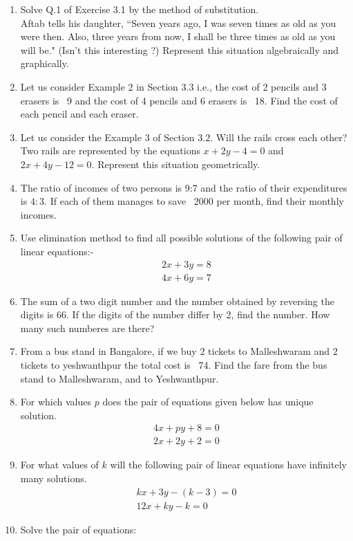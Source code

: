 \documentclass{article}
\theoremstyle{remark}
\begin{document}
\begin{enumerate}
\item Solve Q.1 of Exercise 3.1 by the method of substitution.
\\ Aftab tells his daughter, ``Seven years ago, I was seven times as old as you were then. Also, three years from now, I shall be three times as old as you will be."  (Isn't this interesting ?) Represent this situation algebraically and graphically.
\item Let us consider Example 2 in Section $3.3$ i.e., the cost of 2 pencils and 3 erasers is \rupee~9 and the cost of 4 pencils and 6 erasers is \rupee~18. Find the cost of each pencil and each eraser.
\item Let us consider the Example $3$ of Section $3.2$. Will the rails cross each other? Two rails are represented by the equations $x+2y-4=0$ and $2x+4y-12=0$. Represent this situation geometrically.
\item The ratio of incomes of two persons is 9:7 and the ratio of their expenditures is $4:3$. If each of them manages to save \rupee~2000 per month, find their monthly incomes.
\item Use elimination method to find all possible solutions of the following pair of linear equations:-
\begin{align}
2x+3y = 8 \\ 4x+6y = 7
\end{align}
\item The sum of a two digit number and the number obtained by reversing the digits is $66$. If the digits of the number differ by 2, find the number. How many such numberes are there?
\item From a bus stand in Bangalore, if we buy $2$ tickets to Malleshwaram and $2$ tickets to yeshwanthpur the total cost is \rupee~74. Find the fare from the bus stand to Malleshwaram, and to Yeshwanthpur.
\item For which values $p$ does the pair of equations given below has unique solution.
\begin{align}
4x+py+8 = 0 \\ 2x+2y+2 = 0
\end{align}
\item For what values of $k$ will the following pair of linear equations have infinitely many solutions.
\begin{align}
kx+3y-(k-3) = 0 \\ 12x+ky-k = 0
\end{align}
\item Solve the pair of equations:
\begin{align}

\end{align}
\end{enumerate}
\end{document}
